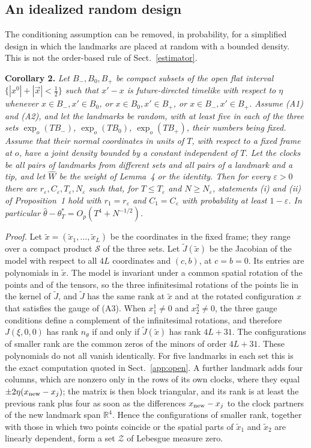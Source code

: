 \subsection{An idealized random design}\label{app:random}
The conditioning assumption can be removed, in probability, for a
simplified design in which the landmarks are placed at random with a
bounded density. This is not the order-based rule of
Sect.~\ref{estimator}.

\medskip
\noindent\textbf{Corollary 2.} \emph{Let $B_-,B_0,B_+$ be compact subsets
of the open flat interval $\{|x^0|+|\vec x|<\tfrac12\}$ such that $x'-x$ is
future-directed timelike with respect to $\eta$ whenever
$x\in B_-,x'\in B_0$, or $x\in B_0,x'\in B_+$, or $x\in B_-,x'\in B_+$.
Assume (A1) and (A2), and let the landmarks be random, with at least five
in each of the three sets $\exp_o(TB_-)$, $\exp_o(TB_0)$, $\exp_o(TB_+)$,
their numbers being fixed. Assume that their normal coordinates in units
of $T$, with respect to a fixed frame at $o$, have a joint density bounded
by a constant independent of $T$. Let the clocks be all pairs of landmarks
from different sets and all pairs of a landmark and a tip, and let
$\widehat W$ be the weight of Lemma~4 or the identity. Then for every
$\varepsilon>0$ there are
$r_\varepsilon,C_\varepsilon,T_\varepsilon,N_\varepsilon$ such that, for
$T\le T_\varepsilon$ and $N\ge N_\varepsilon$, statements (i) and (ii) of
Proposition~1 hold with $r_1=r_\varepsilon$ and $C_1=C_\varepsilon$ with
probability at least $1-\varepsilon$. In particular
$\hat\theta-\theta^*_T=O_p(T^4+N^{-1/2})$.}

\noindent\emph{Proof.} Let $\tilde x=(\tilde x_1,\dots,\tilde x_L)$ be the
coordinates in the fixed frame; they range over a compact product
$\mathcal S$ of the three sets. Let $\tilde J(\tilde x)$ be the Jacobian of
the model with respect to all $4L$ coordinates and $(c,b)$, at $c=b=0$. Its
entries are polynomials in $\tilde x$. The model is invariant under a
common spatial rotation of the points and of the tensors, so the three
infinitesimal rotations of the points lie in the kernel of $\tilde J$, and
$\tilde J$ has the same rank at $\tilde x$ and at the rotated configuration
$x$ that satisfies the gauge of (A3). When $x_1^1\neq0$ and $x_2^2\neq0$,
the three gauge conditions define a complement of the infinitesimal
rotations, and therefore $J(\xi,0,0)$ has rank $n_\theta$ if and only if
$\tilde J(\tilde x)$ has rank $4L+31$. The configurations of smaller rank
are the common zeros of the minors of order $4L+31$. These polynomials do
not all vanish identically. For five landmarks in each set this is the
exact computation quoted in Sect.~\ref{app:open}. A further landmark adds
four columns, which are nonzero only in the rows of its own clocks, where
they equal $\pm2\eta(x_{\rm new}-x_j)$; the matrix is then block
triangular, and its rank is at least the previous rank plus four as soon
as the differences $x_{\rm new}-x_j$ to the clock partners of the new
landmark span $\mathbb R^4$. Hence the configurations of smaller rank,
together with those in which two points coincide or the spatial parts of
$\tilde x_1$ and $\tilde x_2$ are linearly dependent, form a set
$\mathcal Z$ of Lebesgue measure zero.

